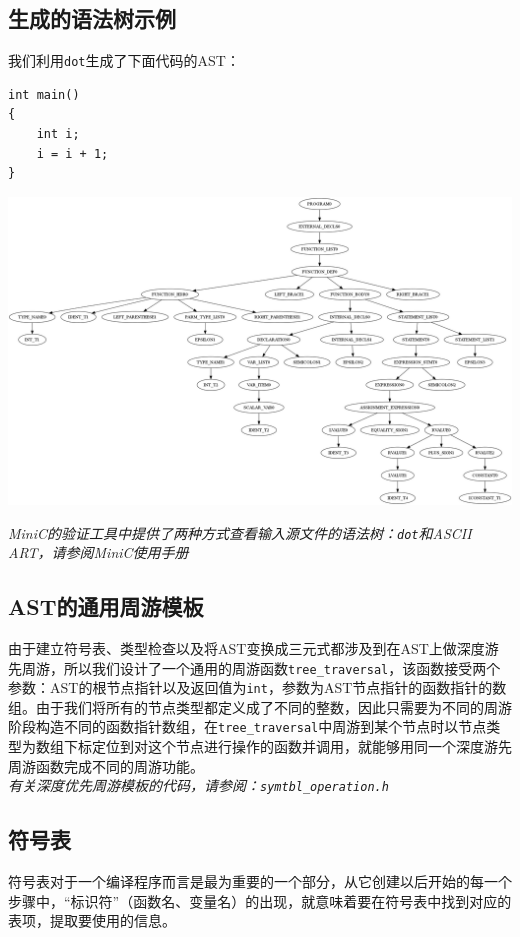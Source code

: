 \subsection{生成的语法树示例}
我们利用\verb|dot|生成了下面代码的AST：
\begin{lstlisting}
int main()
{
	int i;
	i = i + 1;
}

\end{lstlisting}

\begin{center}
	\includegraphics[scale=0.2]{grammer_tree.png}
	\label{fig:grammertree}
\end{center}
{\it \manerrarrow MiniC的验证工具中提供了两种方式查看输入源文件的语法树：\verb|dot|和ASCII ART，请参阅MiniC使用手册}\\
\subsection{AST的通用周游模板}
\label{ASTtravesal}
由于建立符号表、类型检查以及将AST变换成三元式都涉及到在AST上做深度游先周游，所以我们设计了一个通用的周游函数\verb|tree_traversal|，该函数接受两个参数：AST的根节点指针以及返回值为\verb|int|，参数为AST节点指针的函数指针的数组。由于我们将所有的节点类型都定义成了不同的整数，因此只需要为不同的周游阶段构造不同的函数指针数组，在\verb|tree_traversal|中周游到某个节点时以节点类型为数组下标定位到对这个节点进行操作的函数并调用，就能够用同一个深度游先周游函数完成不同的周游功能。\\
{\it \anchor 有关深度优先周游模板的代码，请参阅：\verb|symtbl_operation.h|}\\

\subsection{符号表}
\label{symtbl}
符号表对于一个编译程序而言是最为重要的一个部分，从它创建以后开始的每一个步骤中，“标识符”（函数名、变量名）的出现，就意味着要在符号表中找到对应的表项，提取要使用的信息。

